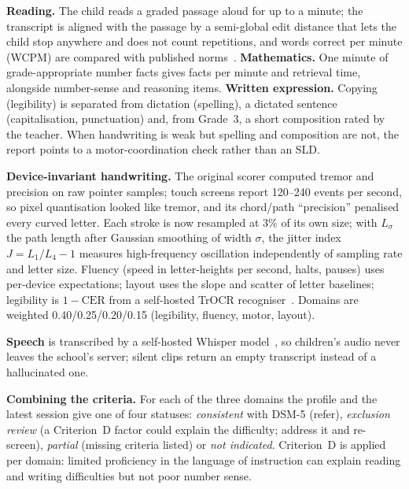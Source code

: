 \documentclass[conference]{IEEEtran}
\begin{document}
\textbf{Reading.} The child reads a graded passage aloud for up to a minute; the transcript is aligned with the passage by a semi-global edit distance that lets the child stop anywhere and does not count repetitions, and words correct per minute (WCPM) are compared with published norms~\cite{hasbrouck2017}. \textbf{Mathematics.} One minute of grade-appropriate number facts gives facts per minute and retrieval time, alongside number-sense and reasoning items. \textbf{Written expression.} Copying (legibility) is separated from dictation (spelling), a dictated sentence (capitalisation, punctuation) and, from Grade~3, a short composition rated by the teacher. When handwriting is weak but spelling and composition are not, the report points to a motor-coordination check rather than an SLD.

\textbf{Device-invariant handwriting.} The original scorer computed tremor and precision on raw pointer samples; touch screens report 120--240 events per second, so pixel quantisation looked like tremor, and its chord/path ``precision'' penalised every curved letter. Each stroke is now resampled at 3\% of its own size; with $L_\sigma$ the path length after Gaussian smoothing of width $\sigma$, the jitter index $J=L_1/L_4-1$ measures high-frequency oscillation independently of sampling rate and letter size. Fluency (speed in letter-heights per second, halts, pauses) uses per-device expectations; layout uses the slope and scatter of letter baselines; legibility is $1-\text{CER}$ from a self-hosted TrOCR recogniser~\cite{li2023trocr}. Domains are weighted 0.40/0.25/0.20/0.15 (legibility, fluency, motor, layout).

\textbf{Speech} is transcribed by a self-hosted Whisper model~\cite{radford2023whisper}, so children's audio never leaves the school's server; silent clips return an empty transcript instead of a hallucinated one.

\textbf{Combining the criteria.} For each of the three domains the profile and the latest session give one of four statuses: \emph{consistent} with DSM-5 (refer), \emph{exclusion review} (a Criterion~D factor could explain the difficulty; address it and re-screen), \emph{partial} (missing criteria listed) or \emph{not indicated}. Criterion~D is applied per domain: limited proficiency in the language of instruction can explain reading and writing difficulties but not poor number sense.

\end{document}
